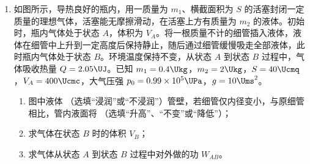 \documentclass[\gkver]{gaokaozhenti}
\begin{document}
\begin{enumerate}
\item
如图所示，导热良好的瓶内，用一质量为 $m_{1}$、横截面积为 $S$ 的活塞封闭一定质量的理想气体，活塞能无摩擦滑动，在活塞上方有质量为 $m_{2}$ 的液体。初始时，瓶内气体处于状态 $A$，体积为 $V_{A}$。将一根质量不计的细管插入液体，液体在细管中上升到一定高度后保持静止，随后通过细管缓慢吸走全部液体，此时瓶内气体处于状态 $B$。环境温度保持不变，从状态 $A$ 到状态 $B$ 过程中，气体吸收热量 $Q = 2.05\UJ$。已知 $m_{1} = 0.4\Ukg$，$m_{2} = 2\Ukg$，$S = 40\Ucmq$，$V_{A} = 400\Ucmc$，大气压强 $p_{0} = 0.99\times10^{5}\UPa$，$g = 10\Ums^{2}$。
\begin{enumerate}
	\item
	图中液体  （选填“浸润”或“不浸润”）管壁，若细管仅内径变小，与原细管相比，管内液面将  （选填“升高”、“不变”或“降低”）；
	\item
	求气体在状态 $B$ 时的体积 $V_{B}$；
	\item
	求气体从状态 $A$ 到状态 $B$ 过程中对外做的功 $W_{AB}$。
\end{enumerate}
\end{enumerate}
\end{document}
